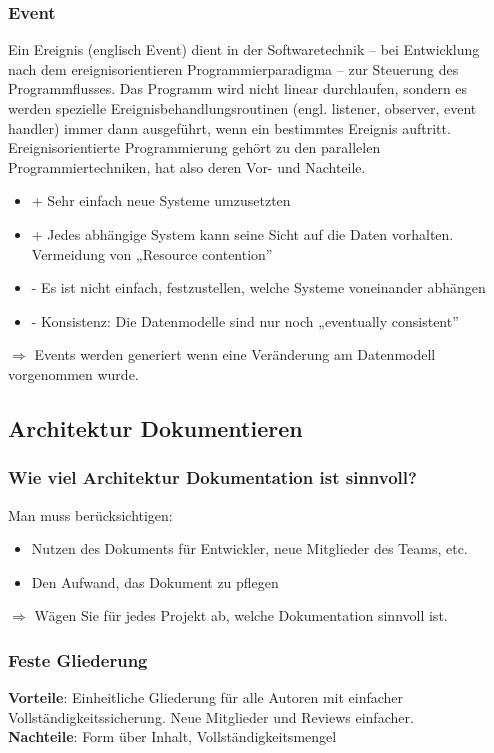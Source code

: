\documentclass[a4paper,10pt]{scrartcl}
\begin{document}
\subsubsection{Event}
Ein Ereignis (englisch Event) dient in der Softwaretechnik – bei Entwicklung nach dem ereignisorientieren Programmierparadigma – zur Steuerung des Programmflusses. Das Programm wird nicht linear durchlaufen, sondern es werden spezielle Ereignisbehandlungsroutinen (engl. listener, observer, event handler) immer dann ausgeführt, wenn ein bestimmtes Ereignis auftritt. Ereignisorientierte Programmierung gehört zu den parallelen Programmiertechniken, hat also deren Vor- und Nachteile.
\begin{itemize}
    \item + Sehr einfach neue Systeme umzusetzten 
    \item + Jedes abhängige System kann seine Sicht auf die Daten vorhalten. Vermeidung von „Resource contention”
    \item - Es ist nicht einfach, festzustellen, welche Systeme voneinander abhängen
    \item - Konsistenz: Die Datenmodelle sind nur noch „eventually consistent”
\end{itemize}
$\Rightarrow$ Events werden generiert wenn eine Veränderung am Datenmodell vorgenommen wurde. 
\subsection{Architektur Dokumentieren}
\subsubsection{Wie viel Architektur Dokumentation ist sinnvoll?}
Man muss berücksichtigen:
\begin{itemize}
    \item Nutzen des Dokuments für Entwickler, neue Mitglieder des Teams, etc.
    \item Den Aufwand, das Dokument zu pflegen
\end{itemize}
$\Rightarrow$ Wägen Sie für jedes Projekt ab, welche Dokumentation sinnvoll ist.
\subsubsection{Feste Gliederung}
\textbf{Vorteile}: Einheitliche Gliederung für alle Autoren mit einfacher Vollständigkeitssicherung. Neue Mitglieder und Reviews einfacher. \\
\textbf{Nachteile}: Form über Inhalt, Vollständigkeitsmengel\\
\end{document}
